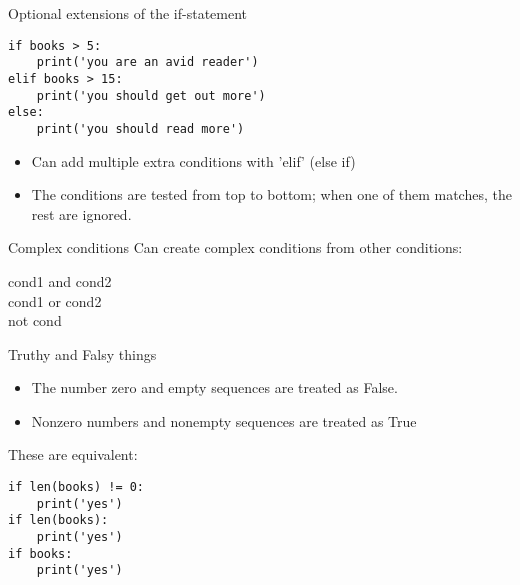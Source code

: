 \documentclass[aspectratio=169,usenames,dvipsnames]{beamer}
\begin{document}
\begin{frame}[fragile]{Optional extensions of the if-statement}
\begin{lstlisting}
if books > 5:
    print('you are an avid reader')
elif books > 15:
    print('you should get out more')
else:
    print('you should read more')
\end{lstlisting}

\begin{itemize}
    \item Can add multiple extra conditions with 'elif' (else if)
    \item The conditions are tested from top to bottom;
            when one of them matches, the rest are ignored.
\end{itemize}
\end{frame}


\begin{frame}{Complex conditions}
    Can create complex conditions from other conditions:
    
    \begin{description}
        \item[cond1 and cond2]
        \item[cond1 or cond2]
        \item[not cond]
    \end{description}

\end{frame}

\begin{frame}[fragile]{Truthy and Falsy things}
\begin{itemize}
\item The number zero and empty sequences are treated as False.
\item Nonzero numbers and nonempty sequences are treated as True
\end{itemize}

These are equivalent:
\begin{lstlisting}
if len(books) != 0:
    print('yes')    
if len(books):
    print('yes')    
if books:
    print('yes')    
\end{lstlisting}

\end{frame}


\frame{\tableofcontents[currentsection]}
\end{document}
